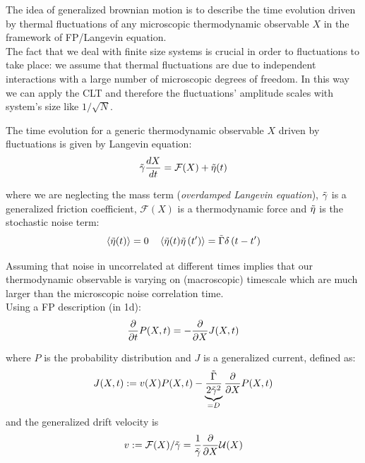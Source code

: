 \documentclass[\main/main.tex]{subfiles}
\begin{document}
The idea of generalized brownian motion is to describe the time evolution driven by thermal fluctuations of any microscopic thermodynamic observable $X$ in the framework of FP/Langevin equation. \\

The fact that we deal with finite size systems is crucial in order to fluctuations to take place: we assume that thermal fluctuations are due to independent interactions with a large number of microscopic degrees of freedom. In this way we can apply the CLT and therefore the fluctuations' amplitude scales with system's size like $1/\sqrt{N}$.

The time evolution for a generic thermodynamic observable $X$ driven by fluctuations is given by Langevin equation: 
\begin{align}
    \Tilde{\gamma}\frac{dX}{dt}=\mathcal{F}(X)+\Tilde{\eta}(t)
\end{align}

where we are neglecting the mass term (\textit{overdamped Langevin equation}), $\Tilde{\gamma}$ is a generalized friction coefficient, $\mathcal{F}(X)$ is a thermodynamic force and $\Tilde{\eta}$ is the stochastic noise term:
\begin{equation}
    \left\langle \Tilde{\eta}(t) \right\rangle=0 \quad\left\langle \Tilde{\eta}(t) \Tilde{\eta}\left(t^{\prime}\right) \right\rangle=\Tilde{\Gamma} \delta\left(t-t^{\prime}\right)
\end{equation}

Assuming that noise in uncorrelated at different times implies that our thermodynamic observable is varying on (macroscopic) timescale which are much larger than the microscopic noise correlation time. \\

Using a FP description (in 1d):
\begin{equation}
    \frac{\partial}{\partial t}P(X,t)=-\frac{\partial}{\partial X}J(X,t)
\end{equation}

where $P$ is the probability distribution and $J$ is a generalized current, defined as:
\begin{equation}
 J(X,t):=v(X)P(X,t)-\underbrace{\frac{\Tilde{\Gamma}}{2\Tilde{\gamma}^2}}_{=D}\frac{\partial}{\partial X}P(X,t)
\end{equation}
and the generalized drift velocity is 
\begin{equation}
  v:=\mathcal{F}(X)/\Tilde{\gamma}=\frac{1}{\Tilde{\gamma}}\frac{\partial}{\partial X}\mathcal{U}(X) 
\end{equation}
\end{document}
